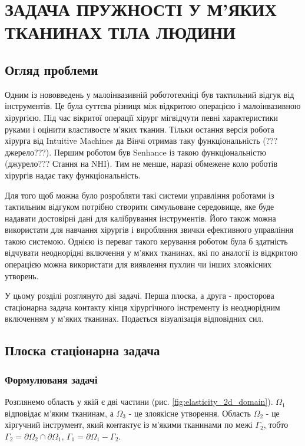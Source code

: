\chapter{ЗАДАЧА ПРУЖНОСТІ У М'ЯКИХ ТКАНИНАХ ТІЛА ЛЮДИНИ}

\nocite{bahvalov-et-al,benerdge-et-al} 

\section{Огляд проблеми}

Одним із нововведень у малоінвазивній робототехніці був тактильний відгук від інструментів. Це була суттєва різниця між
відкритою операцією і малоінвазивною хірургією. Під час вікритої операції хірург міг відчути певні
характеристики руками і оцінити властивосте м'яких тканин. Тільки остання версія робота хірурга від Intuitive Machines
да Вінчі отримав таку функціональність (???джерело???). Першим роботом був Senhance із такою функціональністю
(джурело??? Стання на NHI). Тим не менше, наразі обмежене коло роботів хірургів надає таку функціональність.

Для того щоб можна було розробляти такі системи управління роботами із тактильним відгуком потрібно створити симульоване 
середовище, яке буде надавати достовірні дані для калібрування інструментів. Його також можна використати для навчання
хірургів і виробляння звички ефективного управління такою системою. Однією із переваг такого керування роботом була б 
здатність відчувати неоднорідні включення у м'яких тканинах, які по аналогії із відкритою операцією можна використати 
для виявлення пухлин чи інших злоякісних утворень.

У цьому розділі розглянуто дві задачі. Перша плоска, а друга - просторова стаціонарна задача контакту кінця хірургічного 
інстременту із неоднорідним включенням у м'яких тканинах. Подається візуалізація відповідних сил.

\section{Плоска стаціонарна задача}

\subsection{Формулюваня задачі}

Розглянемо область у якій є дві частини (рис. \ref{fig:elasticity_2d_domain}). $\Omega_1$ відповідає м'яким тканинам, а
$\Omega_3$ - це злоякісне утворення. Область $\Omega_2$ - це хіргучний інструмент, який контактує із м'якими тканинами
по межі $\Gamma_2$, тобто $\Gamma_2=\partial\Omega_2 \cap \partial\Omega_1$, $\Gamma_1 = \partial \Omega_1 - \Gamma_2$.


